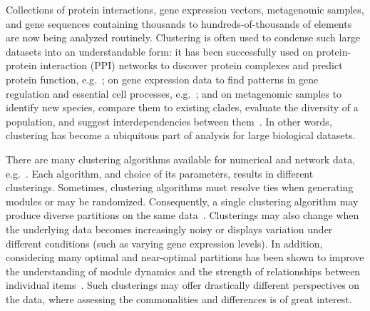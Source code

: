 \documentclass[12pt]{cmuthesis}
\makeatletter
\newcommand{\eg}{e.g.\@}
\makeatother
\begin{document}
  Collections of protein interactions, gene expression vectors, metagenomic samples, and gene sequences containing thousands to hundreds-of-thousands of elements are now being analyzed routinely. 
% 
% 
  Clustering is often used to condense such large datasets into an understandable form: it has been successfully used on protein-protein interaction (PPI) networks to discover protein complexes and predict protein function, \eg~\cite{Sharan2007}; on gene expression data to find patterns in gene regulation and essential cell processes, \eg~\cite{Ulitsky2010}; and on metagenomic samples to identify new species, compare them to existing clades, evaluate the diversity of a population, and suggest interdependencies between them~\cite{Chatterji2007, White2010}. In other words, clustering has become a ubiquitous part of analysis for large biological datasets.


  There are many clustering algorithms available for numerical and network data, \eg~\cite{VanDongen2000, Bader2003, Clauset2004, Adamcsek2006, Blondel2008, Ahn2010, Jiang2010, Rhrissorrakrai2011}. Each algorithm, and choice of its parameters, results in different clusterings. Sometimes, clustering algorithms must resolve ties when generating modules or may be randomized. Consequently, a single clustering algorithm may produce diverse partitions on the same data~\cite{Navlakha10}. Clusterings may also change when the underlying data becomes increasingly noisy or displays variation under different conditions (such as varying gene expression levels). In addition, considering many optimal and near-optimal partitions has been shown to improve the understanding of module dynamics and the strength of relationships between individual items~\cite{Duggal2010, Lewis2010, Langfelder2008, Hopcroft2004}. Such clusterings may offer drastically different perspectives on the data, where assessing the commonalities and differences is of great interest.

\end{document}
